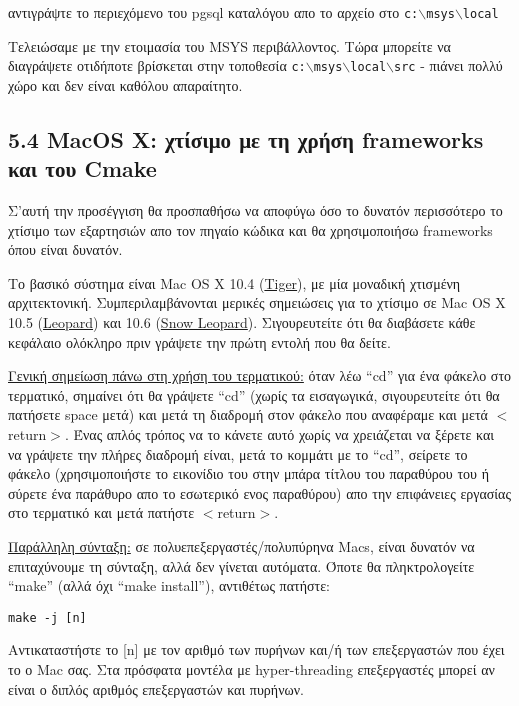 αντιγράψτε το περιεχόμενο του pgsql καταλόγου απο το αρχείο στο \texttt{c:$\backslash$msys$\backslash$local}

Τελειώσαμε με την ετοιμασία του MSYS περιβάλλοντος. Τώρα μπορείτε να διαγράψετε οτιδήποτε βρίσκεται στην τοποθεσία \texttt{c:$\backslash$msys$\backslash$local$\backslash$src} - πιάνει πολλύ χώρο και δεν είναι καθόλου απαραίτητο.


\hypertarget{toc18}{}
\subsection{5.4 MacOS X: χτίσιμο με τη χρήση frameworks και του Cmake}
Σ'αυτή την προσέγγιση θα προσπαθήσω να αποφύγω όσο το δυνατόν περισσότερο το χτίσιμο των εξαρτησιών απο τον πηγαίο κώδικα και θα χρησιμοποιήσω frameworks όπου είναι δυνατόν.

Το βασικό σύστημα είναι Mac OS X 10.4 (\underline{Tiger}), με μία μοναδική χτισμένη αρχιτεκτονική.
Συμπεριλαμβάνονται μερικές σημειώσεις για το χτίσιμο σε  Mac OS X 10.5 (\underline{Leopard}) και 10.6 (\underline{Snow Leopard}).
Σιγουρευτείτε ότι θα διαβάσετε κάθε κεφάλαιο ολόκληρο πριν γράψετε την πρώτη εντολή που θα δείτε.

\underline{Γενική σημείωση πάνω στη χρήση του τερματικού:}  όταν λέω “cd” για ένα φάκελο στο τερματικό, σημαίνει ότι θα γράψετε “cd” (χωρίς τα εισαγωγικά, σιγουρευτείτε ότι θα πατήσετε space μετά) και μετά τη διαδρομή στον φάκελο που αναφέραμε και μετά $<$return$>$. Ένας απλός τρόπος να το κάνετε αυτό χωρίς να χρειάζεται να ξέρετε και να γράψετε την πλήρες διαδρομή είναι, μετά το κομμάτι με το “cd”, σείρετε το φάκελο (χρησιμοποιήστε το εικονίδιο του στην μπάρα τίτλου του παραθύρου του ή σύρετε ένα παράθυρο απο το εσωτερικό ενος παραθύρου) απο την επιφάνειες εργασίας στο τερματικό και μετά πατήστε $<$return$>$.

\underline{Παράλληλη σύνταξη:} σε πολυεπεξεργαστές/πολυπύρηνα Macs, είναι δυνατόν να επιταχύνουμε τη σύνταξη, αλλά δεν γίνεται αυτόματα. Όποτε θα πληκτρολογείτε “make” (αλλά όχι “make install”), αντιθέτως πατήστε:

\begin{verbatim}
make -j [n]
\end{verbatim}

Αντικαταστήστε το  [n] με τον αριθμό των πυρήνων και/ή των επεξεργαστών που έχει το ο Mac σας. Στα πρόσφατα μοντέλα με hyper-threading επεξεργαστές μπορεί αν είναι ο διπλός αριθμός επεξεργαστών και πυρήνων.

